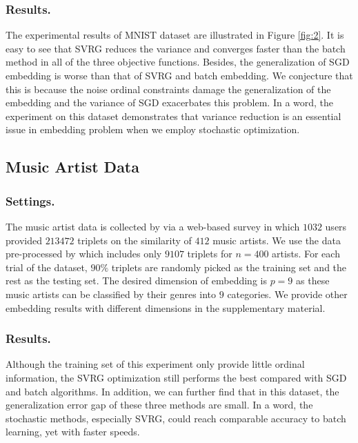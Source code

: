 \documentclass[letterpaper]{article}
\newcommand{\qqxu}[1]{\textcolor[rgb]{0.00,1.00,0.00}{#1}}
\begin{document}
		\subsubsection{Results.}
		The experimental results of MNIST dataset are illustrated in Figure \ref{fig:2}. It is easy to see that SVRG reduces the variance and  converges faster than the batch method in all of the three objective functions. Besides, the generalization of SGD embedding is worse than that of SVRG and batch embedding. We conjecture that this is because the noise ordinal constraints damage the generalization of the embedding and the variance of SGD exacerbates this problem. In a word, the experiment on this dataset demonstrates that variance reduction is an essential issue in embedding problem when we employ stochastic optimization.

		\subsection{Music Artist Data}
		\subsubsection{Settings.}
		The music artist data is collected by \cite{ellis2002quest} via a web-based survey in which $1032$ users provided $213472$ triplets on the similarity of $412$ music artists. We use the data pre-processed by \cite{vandermaaten2012stochastic} which includes only $9107$ triplets for $n=400$ artists. For each trial of the dataset, $90\%$ triplets are randomly picked as the training set and the rest as the testing set. The desired dimension of embedding is $p = 9$ as these music artists can be classified by their genres into $9$ categories. We provide other embedding results with different dimensions in the supplementary material.
		\subsubsection{Results.}
		Although the training set of this experiment only provide little ordinal information, the SVRG optimization still performs the best compared with SGD and batch algorithms. In addition, we can further find that in this dataset, the generalization error gap of these three methods are small. In a word, the stochastic methods, especially SVRG,  could reach comparable accuracy to batch learning, yet with faster speeds.

 

\end{document}
